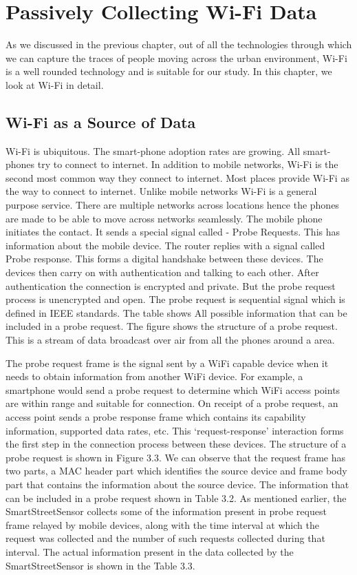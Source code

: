 \chapter{Passively Collecting Wi-Fi Data}

As we discussed in the previous chapter, out of all the technologies through
which we can capture the traces of people moving across the urban environment,
Wi-Fi is a well rounded technology and is suitable for our study. In this
chapter, we look at Wi-Fi in detail.

\section{Wi-Fi as a Source of Data}

Wi-Fi is ubiquitous.
The smart-phone adoption rates are growing.
All smart-phones try to connect to internet.
In addition to mobile networks, Wi-Fi is the second most common way they connect to internet.
Most places provide Wi-Fi as the way to connect to internet.
Unlike mobile networks Wi-Fi is a general purpose service.
There are multiple networks across locations hence the phones are made to be able to move across networks seamlessly.
The mobile phone initiates the contact.
It sends a special signal called - Probe Requests.
This has information about the mobile device.
The router replies with a signal called Probe response.
This forms a digital handshake between these devices.
The devices then carry on with authentication and talking to each other.
After authentication the connection is encrypted and private.
But the probe request process is unencrypted and open.
The probe request is sequential signal which is defined in IEEE standards.
The table shows All possible information that can be included in a probe request.
The figure shows the structure of a probe request.
This is a stream of data broadcast over air from all the phones around a area. 

The probe request frame is the signal sent by a WiFi capable device when it needs to obtain information from another WiFi device.
For example, a smartphone would send a probe request to determine which WiFi access points are within range and suitable for connection.
On receipt of a probe request, an access point sends a probe response frame which contains its capability information, supported data rates, etc.
This ‘request-response’ interaction forms the first step in the connection process between these devices.
The structure of a probe request is shown in Figure 3.3.
We can observe that the request frame has two parts, a MAC header part which identifies the source device and frame body part that contains the information about the source device.
The information that can be included in a probe request shown in Table 3.2.
As mentioned earlier, the SmartStreetSensor collects some of the information present in probe request frame relayed by mobile devices, along with the time interval at which the request was collected and the number of such requests collected during that interval.
The actual information present in the data collected by the SmartStreetSensor is shown in the Table 3.3.

